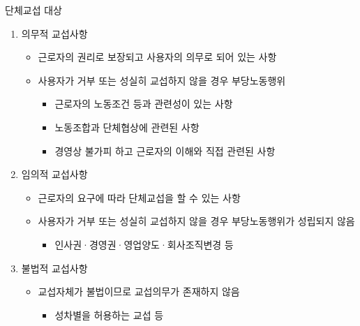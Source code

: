\documentclass[aspectratio=169,xcolor=dvipsnames,handout]{beamer}
\begin{document}
\begin{frame}[allowframebreaks]{단체교섭 대상}
    \begin{enumerate}[<+->]
        \item 의무적 교섭사항
        \begin{itemize}[<+->]
            \item 근로자의 권리로 보장되고 사용자의 의무로 되어 있는 사항
            \item 사용자가 거부 또는 성실히 교섭하지 않을 경우 부당노동행위
            \begin{itemize}[<+->]
                \item 근로자의 노동조건 등과 관련성이 있는 사항
                \item 노동조합과 단체협상에 관련된 사항
                \item 경영상 불가피 하고 근로자의 이해와 직접 관련된 사항
            \end{itemize}
        \end{itemize}
    \framebreak\relax
    \item 임의적 교섭사항
        \begin{itemize}[<+->]
            \item 근로자의 요구에 따라 단체교섭을 할 수 있는 사항
            \item 사용자가 거부 또는 성실히 교섭하지 않을 경우 부당노동행위가 성립되지 않음
            \begin{itemize}[<+->]
                \item 인사권·경영권·영업양도·회사조직변경 등
            \end{itemize}
        \end{itemize}
    \item 불법적 교섭사항
        \begin{itemize}[<+->]
            \item 교섭자체가 불법이므로 교섭의무가 존재하지 않음
            \begin{itemize}[<+->]
                \item 성차별을 허용하는 교섭 등
            \end{itemize}
        \end{itemize}
    \end{enumerate}
\end{frame}
\end{document}
